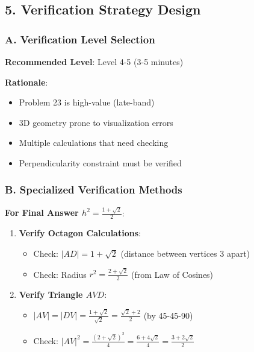 \documentclass[12pt]{article}
\begin{document}
\begin{verificationbox}
\subsection*{5. Verification Strategy Design}

\subsubsection*{A. Verification Level Selection}

\textbf{Recommended Level}: Level 4-5 (3-5 minutes)

\textbf{Rationale}:
\begin{itemize}
    \item Problem 23 is high-value (late-band)
    \item 3D geometry prone to visualization errors
    \item Multiple calculations that need checking
    \item Perpendicularity constraint must be verified
\end{itemize}

\subsubsection*{B. Specialized Verification Methods}

\textbf{For Final Answer $h^2 = \frac{1+\sqrt{2}}{2}$}:

\begin{enumerate}
    \item \textbf{Verify Octagon Calculations}:
    \begin{itemize}
        \item Check: $|AD| = 1 + \sqrt{2}$ (distance between vertices 3 apart)
        \item Check: Radius $r^2 = \frac{2+\sqrt{2}}{2}$ (from Law of Cosines)
    \end{itemize}
    
    \item \textbf{Verify Triangle $AVD$}:
    \begin{itemize}
        \item $|AV| = |DV| = \frac{1+\sqrt{2}}{\sqrt{2}} = \frac{\sqrt{2}+2}{2}$ (by 45-45-90)
        \item Check: $|AV|^2 = \frac{(2+\sqrt{2})^2}{4} = \frac{6+4\sqrt{2}}{4} = \frac{3+2\sqrt{2}}{2}$
    \end{itemize}
    

\end{enumerate}
\end{verificationbox}
\end{document}

